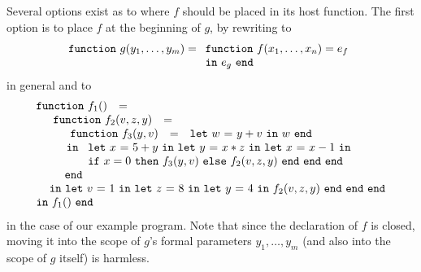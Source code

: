 Several options exist as to where $f$ should be placed in its host
function. The first option is to place $f$ at the beginning of $g$,
by rewriting to 
$$\mathtt{function}\ g(y_1,\ldots,y_m) =
\begin{array}[t]{l} 
  \mathtt{function}\ f(x_1,\ldots,x_n) = e_f\\
  \mathtt{in}\ e_g\ \mathtt{end}
\end{array}
$$ 
in general and to
\begin{equation}
\label{FunctionalConstructionProgram3}
\begin{array}{l}
  \begin{array}{lcl}\mathtt{function}\ f_1() & = & \end{array}\\
  \quad
   \begin{array}[t]{l} 
     \begin{array}{lcl}\mathtt{function}\ f_2(v,z,y) & = & \end{array}\\
     \quad \begin{array}{l}  
             \begin{array}{lcl}\mathtt{function}\ f_3(y,v) & = & \letin w {y+v} w\end{array}\\
             \, \mathtt{in}\
              \begin{array}[t]{l}
                \letinD x {5+y} {
                  \letinD y {x*z} {
                   \letinD x {x-1} {}}}\\ 
                  \ite {x=0} {\call {f_3} {y,v}}
                     {\call {f_2} {v,z,y}}\ \mathtt{end}\ \mathtt{end}\ \mathtt{end}
              \end{array}\\
             \mathtt{end}
           \end{array}\\
     \, \mathtt{in}\ \letin v 1 {
              \letin z 8 {
                 \letin y 4 {\call {f_2} {v,z,y}}
              }
            }
   \end{array}\\
\begin{array}{lcl}
  \mathtt{in}\ f_1()\ \mathtt{end}
\end{array} 
\end{array}
\end{equation}
in the case of our example program. Note that since the declaration of
$f$ is closed, moving it into the scope of $g$'s formal parameters
$y_1,\ldots,y_m$ (and also into the scope of $g$ itself) is harmless.


